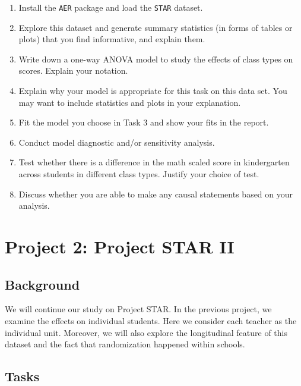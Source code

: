 \documentclass[12pt,]{book}
\providecommand{\tightlist}{%
  \setlength{\itemsep}{0pt}\setlength{\parskip}{0pt}}
\begin{document}
\begin{enumerate}
\def\labelenumi{\arabic{enumi}.}
\tightlist
\item
  Install the \texttt{AER} package and load the \texttt{STAR} dataset.\\
\item
  Explore this dataset and generate summary statistics (in forms of
  tables or plots) that you find informative, and explain them.\\
\item
  Write down a one-way ANOVA model to study the effects of class types
  on scores. Explain your notation.
\item
  Explain why your model is appropriate for this task on this data set.
  You may want to include statistics and plots in your explanation.
\item
  Fit the model you choose in Task 3 and show your fits in the report.
\item
  Conduct model diagnostic and/or sensitivity analysis.
\item
  Test whether there is a difference in the math scaled score in
  kindergarten across students in different class types. Justify your
  choice of test.
\item
  Discuss whether you are able to make any causal statements based on
  your analysis.
\end{enumerate}

\section{Project 2: Project STAR II}\label{project-2-project-star-ii}

\subsection{Background}\label{background-1}

We will continue our study on Project STAR. In the previous project, we
examine the effects on individual students. Here we consider each
teacher as the individual unit. Moreover, we will also explore the
longitudinal feature of this dataset and the fact that randomization
happened within schools.

\subsection{Tasks}\label{tasks-1}
\end{document}
